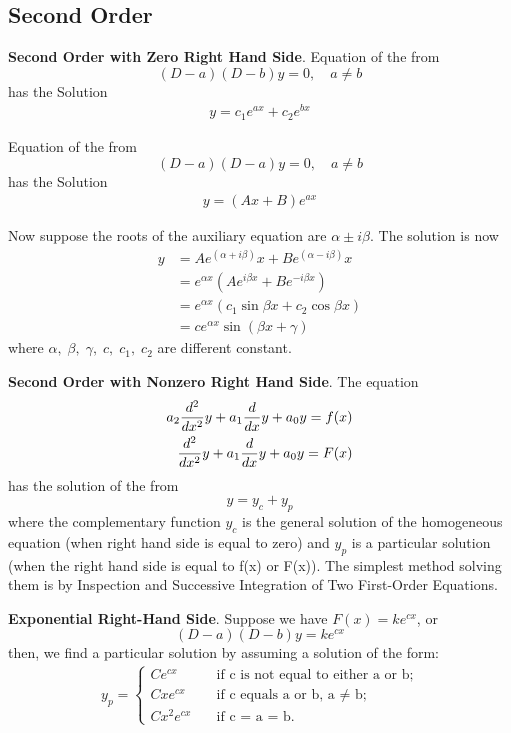 \documentclass[../main.tex]{subfiles}
\begin{document}
\subsection*{Second Order}
\textbf{Second Order with Zero Right Hand Side}. 
Equation of the from
\begin{equation*}
    (D-a)(D-b)y=0,\quad a \neq b
\end{equation*}
has the Solution
\begin{align*}
    y = c_1e^{ax} + c_2e^{bx}
\end{align*}

Equation of the from
\begin{equation*}
    (D-a)(D-a)y=0,\quad a \neq b
\end{equation*}
has the Solution
\begin{align*}
    y = (Ax + B)e^{ax}
\end{align*}

Now suppose the roots of the auxiliary equation are $\alpha \pm i\beta $.
The solution is now
\begin{align*}
    y&=Ae^{(\alpha + i\beta)}x + Be^{(\alpha - i\beta)}x \\
    &=e^{\alpha x}(Ae^{i\beta x} + Be^{-i\beta x})\\
    &= e^{\alpha x}(c_1 \sin \beta x + c_2 \cos \beta x)\\
    &= ce^{\alpha x} \sin(\beta x + \gamma)
\end{align*}
where $\alpha,\;\beta,\;\gamma,\;c,\;c_1,\;c_2$ are different constant.

\textbf{Second Order with Nonzero Right Hand Side}.
The equation
\begin{align*}
    a_2\frac{d^2}{dx^2} y+a_1\frac{d}{dx} y+a_0y=f(x)\\
    \frac{d^2}{dx^2} y+a_1\frac{d}{dx} y+a_0y=F(x)
\end{align*}
has the solution of the from
\begin{equation*}
    y = y_c + y_p
\end{equation*}
where the complementary function $y_c$ is the general solution of the homogeneous
equation (when right hand side is equal to zero) and $y_p$ is a particular solution (when the right hand side is equal to f(x) or F(x)). 
The simplest method solving them is by Inspection and Successive Integration of Two First-Order Equations.

\textbf{Exponential Right-Hand Side}. 
Suppose we have $F (x) = ke^{cx}$, or
\begin{equation*}
    (D - a)(D - b)y =ke^{cx}
\end{equation*}
then, we find a particular solution by
assuming a solution of the form:
\begin{align*}
    y_p=
    \begin{cases}
        Ce^{cx} \quad&\text{if c is not equal to either a or b;}\\
        Cxe^{cx} \quad&\text{if c equals a or b, a  $\neq$ b;}\\
        Cx^2e^{cx} \quad&\text{if c = a = b.}
    \end{cases}
\end{align*}
\end{document}
